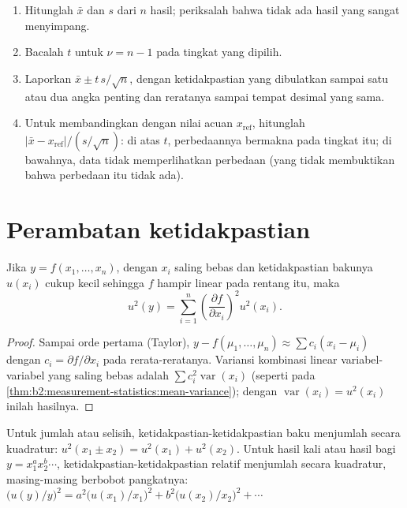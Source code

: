\begin{method}\label{met:b2:measurement-statistics:confidence-interval}
\begin{enumerate}
  \item Hitunglah $\bar x$ dan $s$ dari $n$ hasil; periksalah bahwa tidak
        ada hasil yang sangat menyimpang.
  \item Bacalah $t$ untuk $\nu = n - 1$ pada tingkat yang dipilih.
  \item Laporkan $\bar x \pm t\,s/\sqrt n$, dengan ketidakpastian yang
        dibulatkan sampai satu atau dua angka penting dan reratanya sampai
        tempat desimal yang sama.
  \item Untuk membandingkan dengan nilai acuan $x_{\mathrm{ref}}$, hitunglah $|\bar x - x_{\mathrm{ref}}|/(s/\sqrt
        n)$: di atas $t$, perbedaannya bermakna pada tingkat itu; di bawahnya,
        data tidak memperlihatkan perbedaan (yang tidak membuktikan bahwa
        perbedaan itu tidak ada).
\end{enumerate}
\end{method}

\section{Perambatan ketidakpastian}

\begin{theorem}\label{thm:b2:measurement-statistics:propagation}
Jika $y = f(x_1, \dots, x_n)$, dengan $x_i$ saling bebas dan ketidakpastian
bakunya $u(x_i)$ cukup kecil sehingga $f$ hampir linear pada rentang itu,
maka
\begin{equation*}
u^2(y) = \sum_{i=1}^{n}\left(\frac{\partial f}{\partial x_i}\right)^2 u^2(x_i).
\end{equation*}
\end{theorem}

\begin{proof}
Sampai orde pertama (Taylor), $y - f(\mu_1, \dots, \mu_n) \approx \sum c_i(x_i - \mu_i)$ dengan $c_i = \partial
f/\partial x_i$ pada rerata-reratanya. Variansi kombinasi linear
variabel-variabel yang saling bebas adalah
$\sum c_i^2\operatorname{var}(x_i)$ (seperti pada \cref{thm:b2:measurement-statistics:mean-variance}); dengan
$\operatorname{var}(x_i) = u^2(x_i)$ inilah hasilnya.
\end{proof}

\begin{corollary}\label{cor:b2:measurement-statistics:products}
Untuk jumlah atau selisih, ketidakpastian-ketidakpastian baku menjumlah
secara kuadratur: $u^2(x_1 \pm x_2) = u^2(x_1) +
u^2(x_2)$. Untuk hasil kali atau hasil bagi $y = x_1^{a}x_2^{b}\cdots$,
ketidakpastian-ketidakpastian relatif menjumlah secara kuadratur,
masing-masing berbobot pangkatnya: $\bigl(u(y)/y\bigr)^2 = a^2\bigl(u(x_1)/x_1\bigr)^2 +
b^2\bigl(u(x_2)/x_2\bigr)^2 + \cdots$
\end{corollary}

